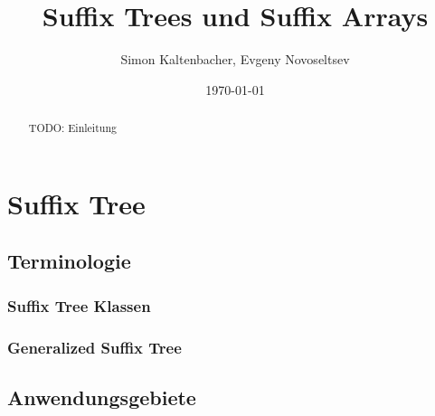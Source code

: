 \documentclass[12pt]{report}
\title{Suffix Trees und Suffix Arrays}
\author{Simon Kaltenbacher, Evgeny Novoseltsev}
\date{\today}
\begin{document}
\maketitle

\tableofcontents

\begin{abstract}
TODO: Einleitung
\end{abstract}

\chapter{Suffix Tree}
\label{chap:suffixTree}

\section{Terminologie}
\label{sec:terminologie}

\subsection{Suffix Tree Klassen}
\label{sec:suffixTreeKlassen}

\subsection{Generalized Suffix Tree}
\label{sec:generalizedSuffixTree}

\section{Anwendungsgebiete}
\label{sec:Anwendungsgebiete}
\end{document}
